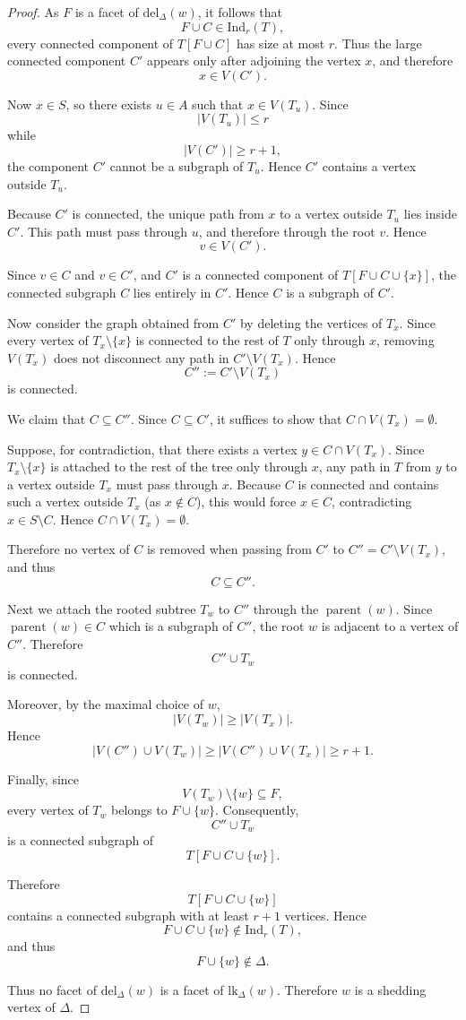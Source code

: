 \documentclass[12pt,reqno]{amsart}
\theoremstyle{definition}
\def\Ind{\mathrm{Ind}}
\def\del{\mathrm{del}}
\def\lk{\mathrm{lk}}
\begin{document}
\begin{proof}
As $F$ is a facet of $\del_{\Delta}(w)$, it follows that
\[
F\cup C\in\Ind_r(T),
\]
every connected component of $T[F\cup C]$ has size at most \(r\). Thus the large connected component \(C'\) appears only after adjoining
the vertex \(x\), and therefore
\[
x\in V(C').
\]

Now $x\in S$,
so there exists \(u\in A\) such that $x\in V(T_u)$.
Since
\[
|V(T_u)|\le r
\]
while
\[
|V(C')|\ge r+1,
\]
the component \(C'\) cannot be a subgraph of \(T_u\). Hence \(C'\) contains a
vertex outside \(T_u\).

Because \(C'\) is connected, the unique path from \(x\) to a vertex outside \(T_u\) lies inside
\(C'\). This path must pass through \(u\), and therefore through the root \(v\). Hence
\[
v\in V(C').
\]

Since \(v \in C\) and \(v \in C'\), and \(C'\) is a connected component of \(T[F \cup C \cup \{x\}]\), the connected subgraph $C$ lies entirely in \(C'\). Hence $C$ is a subgraph of $C'$.

Now consider the graph obtained from \(C'\) by deleting the vertices of $T_x$.
Since every vertex of \(T_x \setminus \{x\}\) is connected to the rest of \(T\) only through \(x\), removing \(V(T_x)\) does not disconnect any path in \(C' \setminus V(T_x)\). Hence
\[
C'' := C' \setminus V(T_x)
\]
is connected.

We claim that \(C \subseteq C''\). Since \(C \subseteq C'\), it suffices to show that \(C \cap V(T_x) = \emptyset\).

Suppose, for contradiction, that there exists a vertex \(y \in C \cap V(T_x)\). Since \(T_x \setminus \{x\}\) is attached to the rest of the tree only through \(x\), any path in \(T\) from \(y\) to a vertex outside \(T_x\) must pass through \(x\). Because \(C\) is connected and contains such a vertex outside \(T_x\) (as \(x \notin C\)), this would force \(x \in C\), contradicting \(x \in S \setminus C\). Hence \(C \cap V(T_x) = \emptyset\).

Therefore no vertex of \(C\) is removed when passing from \(C'\) to \(C'' = C' \setminus V(T_x)\), and thus
\[
C \subseteq C''.
\]

Next we attach the rooted subtree \(T_w\) to $C''$ through the $\operatorname{parent}(w)$. Since $\operatorname{parent}(w)\in C$ which is a subgraph of  $C''$,
the root \(w\) is adjacent to a vertex of \(C''\). Therefore
\[
C''\cup T_w
\]
is connected.

Moreover, by the maximal choice of \(w\),
\[
|V(T_w)|\ge |V(T_x)|.
\]
Hence
\[
|V(C'') \cup V(T_w)|
\ge
|V(C'') \cup V(T_x)| \ge r+1.
\]

Finally, since
\[
V(T_w)\setminus\{w\}\subseteq F,
\]
every vertex of \(T_w\) belongs to \(F\cup\{w\}\). Consequently,
\[
C''\cup T_w
\]
is a connected subgraph of
\[
T[F\cup C\cup\{w\}].
\]

Therefore
\[
T[F\cup C\cup\{w\}]
\]
contains a connected subgraph with at least \(r+1\) vertices. Hence
\[
F\cup C\cup\{w\}\notin\Ind_r(T),
\]
and thus
\[
F\cup\{w\}\notin\Delta.
\]

Thus no facet of \(\del_\Delta(w)\) is a facet of \(\lk_\Delta(w)\). Therefore \(w\) is a
shedding vertex of \(\Delta\).
\end{proof}
\end{document}
